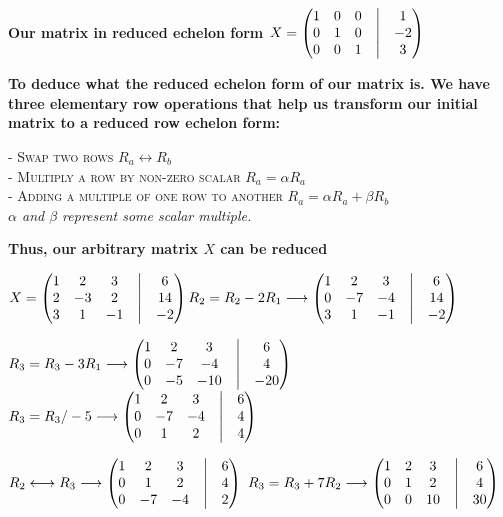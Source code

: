 \documentclass{article}
\begin{document}
	\textbf{Our matrix in reduced echelon form $ X = \begin{pmatrix}
			1 & 0 & 0 &\bigm| & 1\\
			0 & 1 & 0 &\bigm| & -2 \\
			0 & 0 & 1 &\bigm| & 3 
		\end{pmatrix}$}
	
	\textbf{To deduce what the reduced echelon form of our matrix is. We have three elementary row operations that help us transform our initial matrix to a reduced row echelon form:}
	
	\textsc{- Swap two rows $R_{{a}} \longleftrightarrow R_{{b}}$ \\ - Multiply a row by non-zero scalar $R_{{a}} = \alpha R_{{a}}$\\ - Adding a multiple of one row to another $R_{{a}} = \alpha R_{{a}} + \beta R_{{b}}$}\\
	\textit{$\alpha$ and $\beta$ represent some scalar multiple.}
	
	\textbf{Thus, our arbitrary matrix $X$ can be reduced}
	
	\textbf{$ X = \begin{pmatrix}
			1 & 2 & 3 &\bigm| & 6 \\
			2 & -3 & 2 &\bigm| & 14 \\
			3 & 1 & -1 &\bigm| & -2 \end{pmatrix} R_{{2}} = R_{{2}} - 2R_{{1}}\longrightarrow \begin{pmatrix}
			1 & 2 & 3 &\bigm| & 6 \\
			0 & -7 & -4 &\bigm| & 14 \\
			3 & 1 & -1 &\bigm| & -2 \end{pmatrix}$}
	
	\textbf{$R_{{3}} = R_{{3}} - 3R_{{1}} \longrightarrow \begin{pmatrix}
			1 & 2 & 3 &\bigm| & 6 \\
			0 & -7 & -4 &\bigm| & 4 \\
			0 & -5 & -10 &\bigm| & -20 \end{pmatrix}$ $R_{{3}} = R_{{3}}/-5 \longrightarrow \begin{pmatrix}
			1 & 2 & 3 &\bigm| & 6 \\
			0 & -7 & -4 &\bigm| & 4 \\
			0 & 1 & 2 &\bigm| & 4 \end{pmatrix}$}
	
	\textbf{$R_{{2}} \longleftrightarrow R_{{3}} \longrightarrow \begin{pmatrix}
			1 & 2 & 3 &\bigm| & 6 \\
			0 & 1 & 2 &\bigm| & 4 \\
			0 & -7 & -4 &\bigm| & 2 \end{pmatrix}$ $R_{{3}} = R_{{3}} + 7R_{{2}}\longrightarrow \begin{pmatrix}
			1 & 2 & 3 &\bigm| & 6 \\
			0 & 1 & 2 &\bigm| & 4 \\
		0 & 0 & 10 &\bigm| & 30 \end{pmatrix}$}
	
\end{document}
